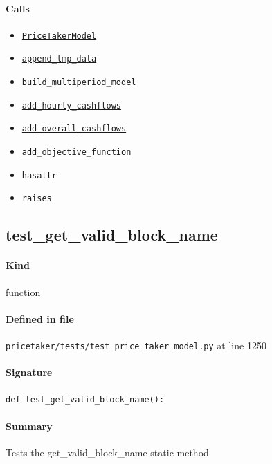\documentclass[11pt]{report}
\begin{document}
\paragraph{Calls}
\begin{itemize}[leftmargin=*]
  \item \hyperref[def:pricetaker-price_taker_model.py:PriceTakerModel:L161]{\texttt{PriceTakerModel}}
  \item \hyperref[def:pricetaker-price_taker_model.py:PriceTakerModel.append_lmp_data:L221]{\texttt{append\_lmp\_data}}
  \item \hyperref[def:pricetaker-price_taker_model.py:PriceTakerModel.build_multiperiod_model:L291]{\texttt{build\_multiperiod\_model}}
  \item \hyperref[def:pricetaker-price_taker_model.py:PriceTakerModel.add_hourly_cashflows:L897]{\texttt{add\_hourly\_cashflows}}
  \item \hyperref[def:pricetaker-price_taker_model.py:PriceTakerModel.add_overall_cashflows:L997]{\texttt{add\_overall\_cashflows}}
  \item \hyperref[def:pricetaker-price_taker_model.py:PriceTakerModel.add_objective_function:L1123]{\texttt{add\_objective\_function}}
  \item \texttt{hasattr}
  \item \texttt{raises}
\end{itemize}
\subsection{test\_get\_valid\_block\_name}
\label{def:pricetaker-tests-test_price_taker_model.py:test_get_valid_block_name:L1250}
\paragraph{Kind} function
\paragraph{Defined in file} \texttt{pricetaker/tests/test\_price\_taker\_model.py} at line 1250
\paragraph{Signature} \texttt{def test\_get\_valid\_block\_name():}
\paragraph{Summary} Tests the get\_valid\_block\_name static method
\end{document}
